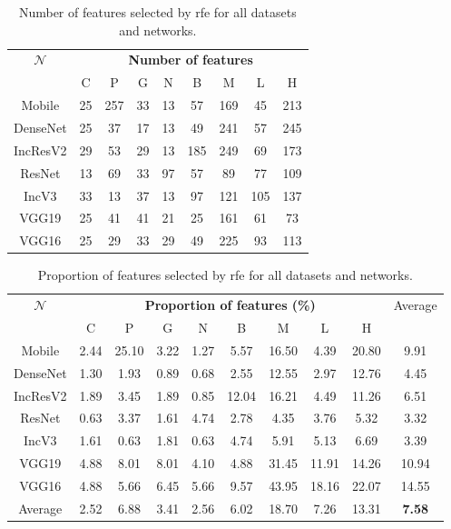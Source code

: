 \begin{table}
     \center 
     \begin{tabular}{|c|cccccccc|}
         \hline
         \multirow{2}{*}{$\mathcal{N}$} & \multicolumn{8}{c|}{\textbf{Number of features}} \\
         \cline{2-9}
         & C & P & G & N & B & M & L & H \\ 
         \hline
         Mobile & 25 & 257 & 33 & 13 & 57 & 169 & 45 & 213 \\
         DenseNet & 25 & 37 & 17 & 13 & 49 & 241 & 57 & 245 \\
         IncResV2 & 29 & 53 & 29 & 13 & 185 & 249 & 69 & 173 \\
         ResNet & 13 & 69 & 33 & 97 & 57 & 89 & 77 & 109 \\
         IncV3 & 33 & 13 & 37 & 13 & 97 & 121 & 105 & 137 \\
         VGG19 & 25 & 41 & 41 & 21 & 25 & 161 & 61 & 73 \\
         VGG16 & 25 & 29 & 33 & 29 & 49 & 225 & 93 & 113 \\
         \hline
         
     \end{tabular}
     \caption{Number of features selected by \acrshort{rfe} for all datasets and networks.}
     \label{app:comp:tab:rfe_selected}
 \end{table}
 
 \begin{table}
     \center 
     \begin{tabular}{|c|cccccccc|c|}
         \hline
         \multirow{2}{*}{$\mathcal{N}$} & \multicolumn{8}{c|}{\textbf{Proportion of features (\%)}} & \multirow{2}{*}{Average}\\
         \cline{2-9}
         & C & P & G & N & B & M & L & H & \\ 
         \hline
         Mobile & 2.44 & 25.10 & 3.22 & 1.27 & 5.57 & 16.50 & 4.39 & 20.80 & 9.91 \\
         DenseNet & 1.30 & 1.93 & 0.89 & 0.68 & 2.55 & 12.55 & 2.97 & 12.76 & 4.45 \\
         IncResV2 & 1.89 & 3.45 & 1.89 & 0.85 & 12.04 & 16.21 & 4.49 & 11.26 & 6.51 \\
         ResNet & 0.63 & 3.37 & 1.61 & 4.74 & 2.78 & 4.35 & 3.76 & 5.32 & 3.32 \\
         IncV3 & 1.61 & 0.63 & 1.81 & 0.63 & 4.74 & 5.91 & 5.13 & 6.69 & 3.39 \\
         VGG19 & 4.88 & 8.01 & 8.01 & 4.10 & 4.88 & 31.45 & 11.91 & 14.26 & 10.94 \\
         VGG16 & 4.88 & 5.66 & 6.45 & 5.66 & 9.57 & 43.95 & 18.16 & 22.07 & 14.55 \\
         \hline
         Average & 2.52 & 6.88 & 3.41 & 2.56 & 6.02 & 18.70 & 7.26 & 13.31 & \textbf{7.58} \\
         \hline
     \end{tabular}
     \caption{Proportion of features selected by \acrshort{rfe} for all datasets and networks.}
     \label{app:comp:tab:rfe_selected_prop}
 \end{table}
 

